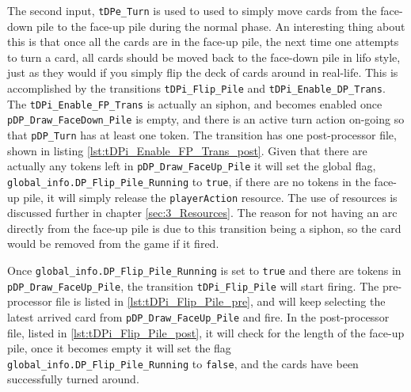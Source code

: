 \documentclass[runningheads,a4paper]{llncs}
\newcommand{\GPenSIM}{../GPenSIM}
\begin{document}
The second input, \verb!tDPe_Turn! is used to used to simply move cards from the face-down pile to the face-up pile during the normal phase. An interesting thing about this is that once all the cards are in the face-up pile, the next time one attempts to turn a card, all cards should be moved back to the face-down pile in \ac{lifo} style, just as they would if you simply flip the deck of cards around in real-life. 
\newline
This is accomplished by the transitions \verb!tDPi_Flip_Pile! and \verb!tDPi_Enable_DP_Trans!. The \verb!tDPi_Enable_FP_Trans! is actually an siphon, and becomes enabled once \verb!pDP_Draw_FaceDown_Pile! is empty, and there is an active turn action on-going so that \verb!pDP_Turn! has at least one token. The transition has one post-processor file, shown in listing \ref{lst:tDPi_Enable_FP_Trans_post}. Given that there are actually any tokens left in \verb!pDP_Draw_FaceUp_Pile! it will set the global flag, \verb!global_info.DP_Flip_Pile_Running! to \verb!true!, if there are no tokens in the face-up pile, it will simply release the \verb!playerAction! resource. The use of resources is discussed further in chapter \ref{sec:3_Resources}. The reason for not having an arc directly from the face-up pile is due to this transition being a siphon, so the card would be removed from the game if it fired.

Once \verb!global_info.DP_Flip_Pile_Running! is set to \verb!true! and there are tokens in \verb!pDP_Draw_FaceUp_Pile!, the transition \verb!tDPi_Flip_Pile! will start firing. The pre-processor file is listed in \ref{lst:tDPi_Flip_Pile_pre}, and will keep selecting the latest arrived card from \verb!pDP_Draw_FaceUp_Pile! and fire. In the post-processor file, listed in \ref{lst:tDPi_Flip_Pile_post}, it will check for the length of the face-up pile, once it becomes empty it will set the flag \verb!global_info.DP_Flip_Pile_Running! to \verb!false!, and the cards have been successfully turned around.


\end{document}
